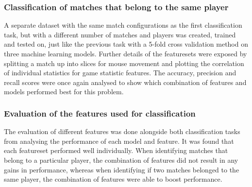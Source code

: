 \documentclass[Report.tex]{subfiles}
\begin{document}
\subsubsection{Classification of matches that belong to the same player}
A separate dataset with the same match configurations as the first classification task, but with a different number of matches and players was created, trained and tested on, just like the previous task with a 5-fold cross validation method on three machine learning models. Further details of the featuresets were exposed by splitting a match up into slices for mouse movement and plotting the correlation of individual statistics for game statistic features. The accuracy, precision and recall scores were once again analysed to show which combination of features and models performed best for this problem. 


\subsubsection{Evaluation of the features used for classification}
The evaluation of different features was done alongside both classification tasks from analysing the performance of each model and feature. It was found that each featureset performed well individually. When identifying matches that belong to a particular player, the combination of features did not result in any gains in performance, whereas when identifying if two matches belonged to the same player, the combination of features were able to boost performance. 





\end{document}
